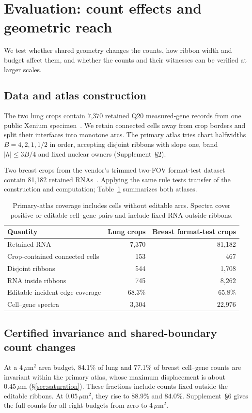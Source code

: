 \documentclass[10pt,letterpaper]{article}
\begin{document}
\section{Evaluation: count effects and geometric reach}\label{sec:eval}
We test whether shared geometry changes the counts, how ribbon width and budget affect them, and whether the counts and their witnesses can be verified at larger scales.
\subsection{Data and atlas construction}
The two lung crops contain 7,370 retained Q20 measured-gene records from one public Xenium specimen~\cite{data,xenium}. We retain connected cells away from crop borders and split their interfaces into monotone arcs. The primary atlas tries chart halfwidths $B=4,2,1,1/2$ in order, accepting disjoint ribbons with slope one, band $|h|\le3B/4$ and fixed nuclear owners (Supplement~\S2).

Two breast crops from the vendor's trimmed two-FOV format-test dataset contain 81,182 retained RNAs~\cite{breasttest}. Applying the same rule tests transfer of the construction and computation; Table~\ref{tab:scope} summarizes both atlases.

\begin{table}[!htbp]\centering
\begin{tabular}{lrr}\toprule
Quantity&Lung crops&Breast format-test crops\\\midrule
Retained RNA&7,370&81,182\\
Crop-contained connected cells&153&467\\
Disjoint ribbons&544&1,708\\
RNA inside ribbons&745&8,262\\
Editable incident-edge coverage&68.3\%&65.8\%\\
Cell--gene spectra&3,304&22,976\\
\bottomrule
\end{tabular}
\caption{Primary-atlas coverage includes cells without editable arcs. Spectra cover positive or editable cell--gene pairs and include fixed RNA outside ribbons.}\label{tab:scope}
\end{table}

\FloatBarrier
\subsection{Certified invariance and shared-boundary count changes}\label{sec:effects}
At a $4\,\mu\mathrm m^2$ area budget, 84.1\% of lung and 77.1\% of breast cell--gene counts are invariant within the primary atlas, whose maximum displacement is about $0.45\,\mu\mathrm m$ (\S\ref{sec:saturation}). These fractions include counts fixed outside the editable ribbons. At $0.05\,\mu\mathrm m^2$, they rise to 88.9\% and 84.0\%. Supplement~\S6 gives the full counts for all eight budgets from zero to $4\,\mu\mathrm m^2$.
\end{document}
